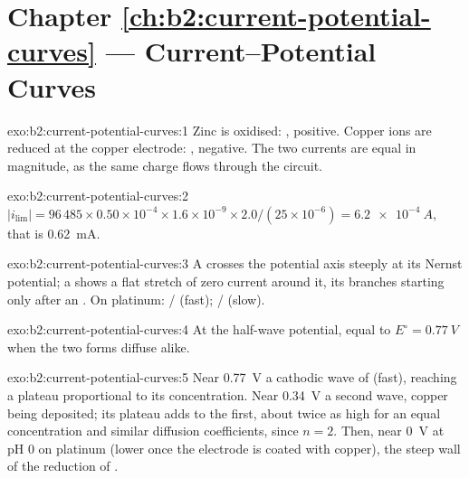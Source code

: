 \section*{Chapter \ref{ch:b2:current-potential-curves} --- Current--Potential Curves}

\begin{solution}{exo:b2:current-potential-curves:1}
Zinc is oxidised: , positive. Copper ions are reduced at the
copper electrode: , negative. The two currents are equal in
magnitude, as the same charge flows through the circuit.
\end{solution}

\begin{solution}{exo:b2:current-potential-curves:2}
$|i_{\lim}| = 96\,485 \times 0.50 \times 10^{-4} \times 1.6 \times 10^{-9} \times
2.0/(25 \times 10^{-6}) = \qty{6.2e-4}{A}$, that is \qty{0.62}{mA}.
\end{solution}

\begin{solution}{exo:b2:current-potential-curves:3}
A  crosses the potential axis steeply at its Nernst potential; a  shows a flat stretch of zero current around it, its branches starting
only after an . On platinum: / (fast);
/ (slow).
\end{solution}

\begin{solution}{exo:b2:current-potential-curves:4}
At the half-wave potential, equal to $E^\circ = \qty{0.77}{V}$ when the two forms
diffuse alike.
\end{solution}

\begin{solution}{exo:b2:current-potential-curves:5}
Near \qty{0.77}{V} a cathodic wave of  (fast), reaching a plateau
proportional to its concentration. Near \qty{0.34}{V} a second wave, copper being
deposited; its plateau adds to the first, about twice as high for an equal
concentration and similar diffusion coefficients, since $n = 2$. Then, near
\qty{0}{V} at pH 0 on platinum (lower once the electrode is coated with copper),
the steep wall of the reduction of .
\end{solution}

